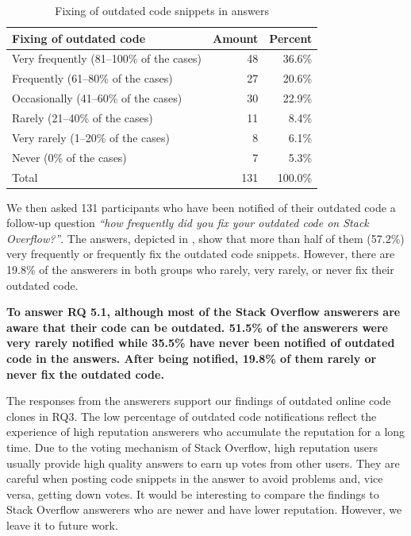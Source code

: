 \documentclass[10pt,journal,compsoc]{IEEEtran}
\begin{document}
\begin{table}
	\centering
	\caption{Fixing of outdated code snippets in answers}
	\label{tab:survey_code_snippet_outdated_fix}
	\begin{tabular}{lrr}
		\toprule
		Fixing of outdated code & Amount & Percent \\
		\midrule
		Very frequently (81--100\% of the cases) & 48 & 36.6\% \\
		Frequently (61--80\% of the cases) & 27 & 20.6\% \\
		Occasionally (41--60\% of the cases) & 30 & 22.9\% \\
		Rarely (21--40\% of the cases) & 11 & 8.4\% \\
		Very rarely (1--20\% of the cases) & 8 & 6.1\% \\
		Never (0\% of the cases) & 7 & 5.3\% \\
		\midrule
		Total & 131 & 100.0\% \\
		\bottomrule
	\end{tabular}
\end{table}

We then asked 131 participants who have been notified of their outdated code a
follow-up question \textit{``how frequently did you fix your outdated code on Stack
Overflow?''}. The answers, depicted in
, show that more than half of them
(57.2\%) very frequently or frequently fix the outdated code snippets. However,
there are 19.8\% of the answerers in both groups who rarely, very rarely, or never fix 
their outdated code.

\textbf{To answer RQ 5.1, although most of the Stack Overflow answerers are aware that their code
can be outdated. 51.5\% of the answerers were very rarely notified while 35.5\% have never been notified of
outdated code in the answers. After being notified, 19.8\% of them rarely or never fix the outdated code.}

The responses from the answerers support our findings of outdated online code
clones in RQ3. The low percentage of outdated code notifications
reflect the experience of high reputation answerers who accumulate the reputation for a
long time. Due to the voting mechanism of Stack Overflow, high reputation users
usually provide high quality answers to earn up votes from other users. They are
careful when posting code snippets in the answer to avoid problems and, vice versa, 
getting down votes. It would be interesting to compare the findings to
Stack Overflow answerers who are newer and have lower reputation. However, we
leave it to future work.
\end{document}
